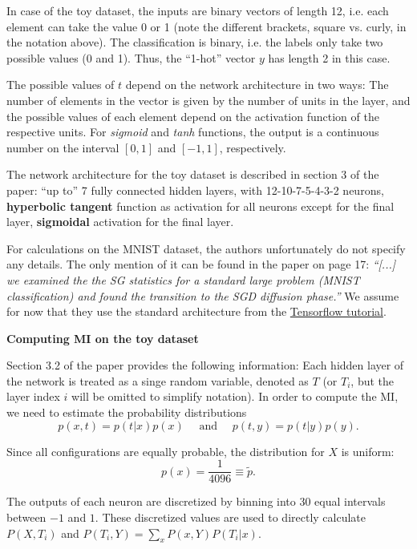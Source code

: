 \documentclass[12pt]{report}
\begin{document}
In case of the toy dataset, the inputs are binary vectors of length 12, i.e. each element can take the value 0 or 1 (note the different brackets, square vs. curly, in the notation above). The classification is binary, i.e. the labels only take two possible values (0 and 1). Thus, the ``1-hot'' vector $y$ has length 2 in this case.
 
The possible values of $t$ depend on the network architecture in two ways: The number of elements in the vector is given by the number of units in the layer, and the possible values of each element depend on the activation function of the respective units. For {\it sigmoid} and {\it tanh} functions, the output is a continuous number on the interval $[0,1]$ and $[-1,1]$, respectively.

The network architecture for the toy dataset is described in section 3 of the paper: ``up to'' 7 fully connected hidden layers, with 12-10-7-5-4-3-2 neurons, {\bf hyperbolic tangent} function as activation for all neurons except for the final layer, {\bf sigmoidal} activation for the final layer.

For calculations on the MNIST dataset, the authors unfortunately do not specify any details. The only mention of it can be found in the paper on page 17: {\it ``[...] we examined the the SG statistics for a standard large problem (MNIST classification) and found the transition to the SGD diffusion phase.''} We assume for now that they use the standard architecture from the \href{https://www.tensorflow.org/get_started/mnist/beginners}{Tensorflow tutorial}.


\vspace{1cm}
{\bf Computing MI on the toy dataset}

Section 3.2 of the paper provides the following information: 
Each hidden layer of the network is treated as a singe random variable, denoted as $T$ (or $T_i$, but the layer index $i$ will be omitted to simplify notation).
In order to compute the MI, we need to estimate the probability distributions
\begin{equation}
p(x,t)=p(t|x)p(x) \quad\text{ and }\quad p(t,y)=p(t|y)p(y).
\end{equation}

Since all configurations are equally probable, the distribution for $X$ is uniform:
\begin{equation}
p(x) = \frac{1}{4096} \equiv \tilde{p}.
\end{equation}

The outputs of each neuron are discretized by binning into 30 equal intervals between $-1$ and $1$. These discretized values are used to directly calculate $P(X, T_i)$ and $P(T_i, Y) = \sum_x P(x,Y)P(T_i | x)$.
\end{document}
